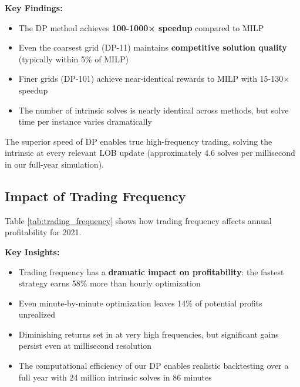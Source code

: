 \documentclass[10pt,twocolumn]{article}
\begin{document}
\textbf{Key Findings:}
\begin{itemize}
\item The DP method achieves \textbf{100-1000× speedup} compared to MILP
\item Even the coarsest grid (DP-11) maintains \textbf{competitive solution quality} (typically within 5\% of MILP)
\item Finer grids (DP-101) achieve near-identical rewards to MILP with 15-130× speedup
\item The number of intrinsic solves is nearly identical across methods, but solve time per instance varies dramatically
\end{itemize}

The superior speed of DP enables true high-frequency trading, solving the intrinsic at every relevant LOB update (approximately 4.6 solves per millisecond in our full-year simulation).

\subsection{Impact of Trading Frequency}
Table \ref{tab:trading_frequency} shows how trading frequency affects annual profitability for 2021.


\textbf{Key Insights:}
\begin{itemize}
\item Trading frequency has a \textbf{dramatic impact on profitability}: the fastest strategy earns 58\% more than hourly optimization
\item Even minute-by-minute optimization leaves 14\% of potential profits unrealized
\item Diminishing returns set in at very high frequencies, but significant gains persist even at millisecond resolution
\item The computational efficiency of our DP enables realistic backtesting over a full year with 24 million intrinsic solves in 86 minutes
\end{itemize}
\end{document}
